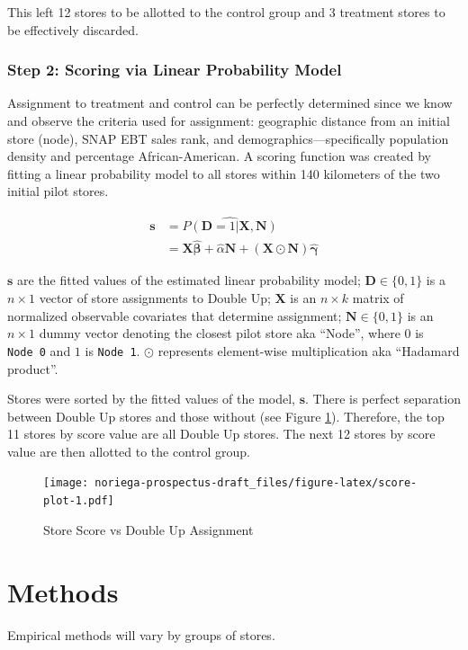 \documentclass[12pt,letterpaperpaper,]{book}
\begin{document}
This left 12 stores to be allotted to the control group and 3 treatment
stores to be effectively discarded.

\subsubsection*{Step 2: Scoring via Linear Probability
Model}\label{step-2-scoring-via-linear-probability-model}

Assignment to treatment and control can be perfectly determined since we
know and observe the criteria used for assignment: geographic distance
from an initial store (node), SNAP EBT sales rank, and
demographics---specifically population density and percentage
African-American. A scoring function was created by fitting a linear
probability model to all stores within 140 kilometers of the two initial
pilot stores.

\[
\begin{aligned}
  \bm{s}  &= \widehat{P(\mathbf{D} = 1 | \bm{X}, \bm{N})} \\
          &= \mathbf{X} \bm{\hat \beta} + \hat \alpha \mathbf{N} + \left (\mathbf{X} \odot \mathbf{N} \right ) \bm{\hat \gamma}
\end{aligned}
\]

\(\bm{s}\) are the fitted values of the estimated linear probability
model; \(\mathbf{D} \in \{0,1 \}\) is a \(n \times 1\) vector of store
assignments to Double Up; \(\mathbf{X}\) is an \(n \times k\) matrix of
normalized observable covariates that determine assignment;
\(\mathbf{N} \in \{0, 1 \}\) is an \(n \times 1\) dummy vector denoting
the closest pilot store aka ``Node'', where \(0\) is \texttt{Node\ 0}
and \(1\) is \texttt{Node\ 1}. \(\odot\) represents element-wise
multiplication aka ``Hadamard product''.

Stores were sorted by the fitted values of the model, \(\bm{s}\). There
is perfect separation between Double Up stores and those without (see
Figure \ref{fig:score-plot}). Therefore, the top 11 stores by score
value are all Double Up stores. The next 12 stores by score value are
then allotted to the control group.

\begin{figure}[htbp]
\centering
\texttt{[image: noriega-prospectus-draft\_files/figure-latex/score-plot-1.pdf]}
\caption{\label{fig:score-plot}Store Score vs Double Up Assignment}
\end{figure}

\hypertarget{methods}{\section{Methods}\label{methods}}

Empirical methods will vary by groups of stores.


\end{document}
